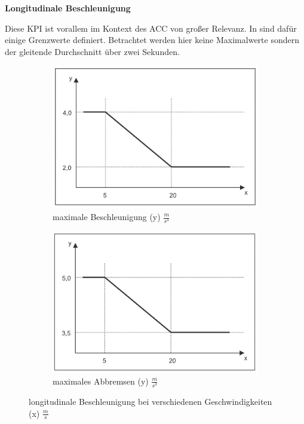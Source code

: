 \bigskip\noindent\textbf{Longitudinale Beschleunigung}

\noindent Diese KPI ist vorallem im Kontext des ACC von großer Relevanz. In \cite{ISO15622} sind dafür einige Grenzwerte definiert. Betrachtet werden hier keine Maximalwerte sondern der gleitende Durchschnitt über zwei Sekunden.
\begin{figure}
    \centering
    \begin{subfigure}[b]{.4\linewidth}
        \centering
        \includegraphics[width=\textwidth]{figures/3_Implementierung/max_acceleration.png}
        \caption{maximale Beschleunigung (y) $\frac{m}{s^{3}}$}
        \label{fig:max_acceleration}
    \end{subfigure}
    \hfill
    \begin{subfigure}[b]{.4\linewidth}
        \centering
        \includegraphics[width=\textwidth]{figures/3_Implementierung/max_deceleration.png}
        \caption{maximales Abbremsen (y) $\frac{m}{s^{3}}$}
        \label{fig:max_deceleration}
    \end{subfigure}
    \caption{longitudinale Beschleunigung bei verschiedenen Geschwindigkeiten (x) $\frac{m}{s}$ \cite{ISO15622}}
    \label{fig:iso_acceleration}
\end{figure}

